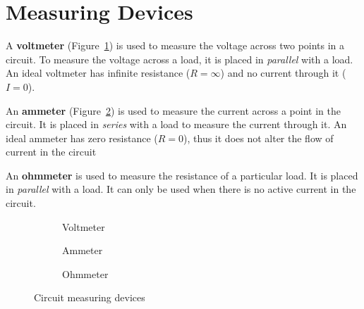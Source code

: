 \section{Measuring Devices}

A \textbf{voltmeter} (Figure~\ref{fig:voltmeter}) is used to measure the voltage
across two points in a circuit. To measure the voltage across a load, it is
placed in \emph{parallel} with a load. %
An ideal voltmeter has infinite resistance ($R=\infty$) and no current through
it ($I=0$).

An \textbf{ammeter} (Figure~\ref{fig:ammeter}) is used to measure the current
across a point in the circuit. It is placed in \emph{series} with a load to
measure the current through it. An ideal ammeter has zero resistance ($R=0$),
thus it does not alter the flow of current in the circuit

An \textbf{ohmmeter} is used to measure the resistance of a particular load.
It is placed in \emph{parallel} with a load.
It can only be used when there is no active current in the circuit.
\begin{figure}[ht]
  \centering
  \begin{subfigure}{.32\textwidth}
    \centering
    \caption{Voltmeter}
    \label{fig:voltmeter}
  \end{subfigure}
  \begin{subfigure}{.32\textwidth}
    \centering
    \vspace{.47in}
    \caption{Ammeter}
    \label{fig:ammeter}
  \end{subfigure}
  \begin{subfigure}{.32\textwidth}
    \centering
    \caption{Ohmmeter}
  \end{subfigure}
  \caption{Circuit measuring devices}
\end{figure}

